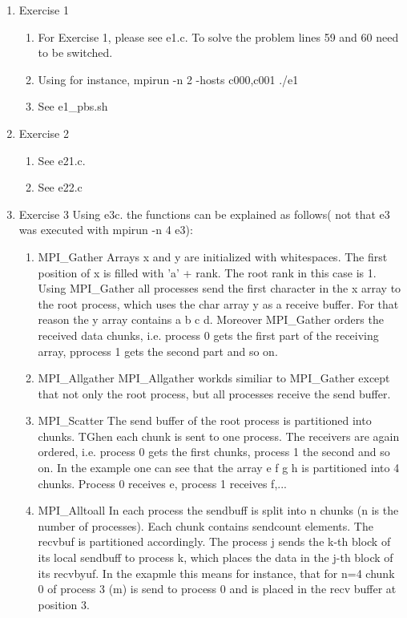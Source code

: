 \documentclass[12pt]{scrartcl}
\begin{document}
\begin{enumerate}
    \item{Exercise 1}
        \begin{enumerate}
            \item For Exercise 1, please see e1.c. To solve the problem lines 59 and 60 need to be switched.
            \item Using for instance, mpirun -n 2 -hosts c000,c001 ./e1
            \item See e1\_pbs.sh
        \end{enumerate}
    \item{Exercise 2}
        \begin{enumerate}
            \item See e21.c.
            \item See e22.c
        \end{enumerate}
    \item{Exercise 3}
        Using e3c. the functions can be explained as follows( not that e3 was executed with mpirun -n 4 e3):
        \begin{enumerate}
            \item{MPI\_Gather} Arrays x and y are initialized with whitespaces. The first position of x is filled with 'a' + rank. The root rank in this case is 1. Using MPI\_Gather all processes send the first character in the x array to the root process, which uses the char array y as a receive buffer. For that reason the y array contains a b c d. Moreover MPI\_Gather orders the received data chunks, i.e. process 0 gets the first part of the receiving array, pprocess 1 gets the second part and so on. 
            \item{MPI\_Allgather} MPI\_Allgather workds similiar to MPI\_Gather except that not only the root process, but all processes receive the send buffer.
            \item{MPI\_Scatter} The send buffer of the root process is partitioned into chunks. TGhen each chunk is sent to one process. The receivers are again ordered, i.e. process 0 gets the first chunks, process 1 the second and so on. In the example one can see that the array e f g h is partitioned into 4 chunks. Process 0 receives e, process 1 receives f,...
            \item{MPI\_Alltoall} In each process the sendbuff is split into n chunks (n is the number of processes). Each chunk contains sendcount elements. The recvbuf is partitioned accordingly. The process j sends the k-th block of its local sendbuff to process k, which places the data in the j-th block of its recvbyuf. In the exapmle this means for instance, that for n=4 chunk 0 of process 3 (m) is send to process 0 and is placed in the recv buffer at position 3. 

\end{enumerate}
\end{enumerate}
\end{document}
